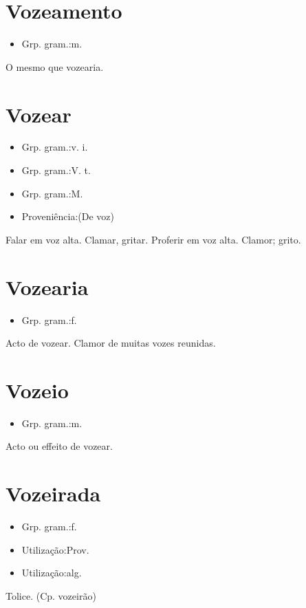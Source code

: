 \documentclass{article}
\begin{document}
\section{Vozeamento}
\begin{itemize}
\item {Grp. gram.:m.}
\end{itemize}
O mesmo que \textunderscore vozearia\textunderscore .
\section{Vozear}
\begin{itemize}
\item {Grp. gram.:v. i.}
\end{itemize}
\begin{itemize}
\item {Grp. gram.:V. t.}
\end{itemize}
\begin{itemize}
\item {Grp. gram.:M.}
\end{itemize}
\begin{itemize}
\item {Proveniência:(De \textunderscore voz\textunderscore )}
\end{itemize}
Falar em voz alta.
Clamar, gritar.
Proferir em voz alta.
Clamor; grito.
\section{Vozearia}
\begin{itemize}
\item {Grp. gram.:f.}
\end{itemize}
Acto de vozear.
Clamor de muitas vozes reunidas.
\section{Vozeio}
\begin{itemize}
\item {Grp. gram.:m.}
\end{itemize}
Acto ou effeito de vozear.
\section{Vozeirada}
\begin{itemize}
\item {Grp. gram.:f.}
\end{itemize}
\begin{itemize}
\item {Utilização:Prov.}
\end{itemize}
\begin{itemize}
\item {Utilização:alg.}
\end{itemize}
Tolice.
(Cp. \textunderscore vozeirão\textunderscore )
\end{document}
